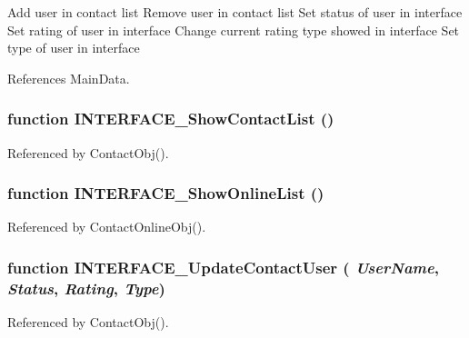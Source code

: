 Add user in contact list Remove user in contact list Set status of user in interface Set rating of user in interface Change current rating type showed in interface Set type of user in interface 

References MainData.
\subsubsection{\setlength{\rightskip}{0pt plus 5cm}function INTERFACE\_\-ShowContactList ()}\label{interface_2contact_8js_91c5d6feebd8eccac587290d5e74134c}




Referenced by ContactObj().
\subsubsection{\setlength{\rightskip}{0pt plus 5cm}function INTERFACE\_\-ShowOnlineList ()}\label{interface_2contact_8js_25c673d2d7d179fdca8de7d03f205b17}




Referenced by ContactOnlineObj().
\subsubsection{\setlength{\rightskip}{0pt plus 5cm}function INTERFACE\_\-UpdateContactUser ( {\em UserName}, \/   {\em Status}, \/   {\em Rating}, \/   {\em Type})}\label{interface_2contact_8js_f2eab82d0c214c7da4d76f5f05c1500a}




Referenced by ContactObj().